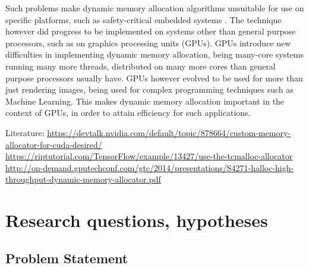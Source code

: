 \documentclass[12pt,twoside]{article}
\begin{document}
Such problems make dynamic memory allocation algorithms unsuitable for use on specific platforms, such as safety-critical embedded systems \cite{Puaut_2002}. The technique however did progress to be implemented on systems other than general purpose processors, such as on graphics processing units (GPUs). GPUs introduce new difficulties in implementing dynamic memory allocation, being many-core systems running many more threads, distributed on many more cores than general purpose processors usually have. GPUs however evolved to be used for more than just rendering images, being used for complex programming techniques such as Machine Learning. This makes dynamic memory allocation important in the context of GPUs, in order to attain efficiency for such applications. %

Literature:
\url{https://devtalk.nvidia.com/default/topic/878664/custom-memory-allocator-for-cuda-desired/}
\url{https://riptutorial.com/TensorFlow/example/13427/use-the-tcmalloc-allocator}
\url{http://on-demand.gputechconf.com/gtc/2014/presentations/S4271-halloc-high-throughput-dynamic-memory-allocator.pdf}


\section{Research questions, hypotheses}
\label{sect:questions}

\subsection{Problem Statement}
\label{sec:problem-statement}

\end{document}

